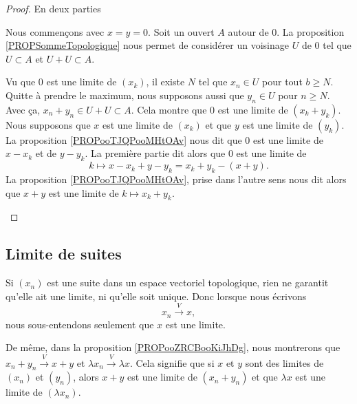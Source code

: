 \begin{proof}
	En deux parties
	\begin{subproof}
		\spitem[Le cas \( x=y=0\)]
		Nous commençons avec \( x=y=0\). Soit un ouvert \( A\) autour de \( 0\). La proposition \ref{PROPSommeTopologique} nous permet de considérer un voisinage \( U\) de \( 0\) tel que \( U\subset A\) et \( U+U\subset A\).

		Vu que \( 0\) est une limite de \( (x_k)\), il existe \( N\) tel que \( x_n\in U\) pour tout \( b\geq N\). Quitte à prendre le maximum, nous supposons aussi que \( y_n\in U\) pour \( n\geq N\). Avec ça, \( x_n+y_n\in U+U\subset A\). Cela montre que \( 0\) est une limite de \( (x_k+y_k)\).
		Nous supposons que \( x\) est une limite de \( (x_k)\) et que \( y\) est une limite de \( (y_k)\). La proposition \ref{PROPooTJQPooMHtOAv} nous dit que \( 0\) est une limite de \( x-x_k\) et de \( y-y_k\). La première partie dit alors que \( 0\) est une limite de
		\begin{equation}
			k\mapsto x-x_k+y-y_k=x_k+y_k-(x+y).
		\end{equation}
		La proposition \ref{PROPooTJQPooMHtOAv}, prise dans l'autre sens nous dit alors que \( x+y\) est une limite de \( k\mapsto x_k+y_k\).
	\end{subproof}
\end{proof}



\subsection{Limite de suites}

Si \( (x_n)\) est une suite dans un espace vectoriel topologique, rien ne garantit qu'elle ait une limite, ni qu'elle soit unique. Donc lorsque nous écrivons
\begin{equation}
	x_n\stackrel{V}{\longrightarrow}x,
\end{equation}
nous sous-entendons seulement que \( x\) est une limite.

De même, dans la proposition \ref{PROPooZRCBooKiJhDg}, nous montrerons que \( x_n+y_n\stackrel{V}{\longrightarrow}x+y\) et \( \lambda x_n\stackrel{ V}{\longrightarrow}\lambda x\). Cela signifie que si \( x\) et \( y\) sont des limites de \( (x_n)\) et \( (y_n)\), alors \( x+y\) est une limite de \( (x_n+y_n)\) et que \( \lambda x\) est une limite de \( (\lambda x_n)\).


